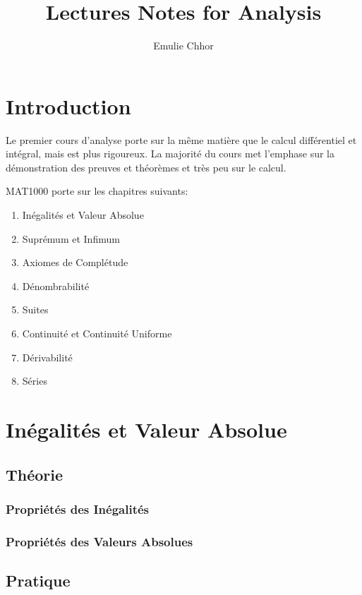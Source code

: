 \documentclass{article}
\begin{document}
\title{Lectures Notes for Analysis}
\author{Emulie Chhor}
\maketitle

\section{Introduction}

Le premier cours d'analyse porte sur la même matière que le calcul différentiel
et intégral, mais est plus rigoureux. La majorité du cours met l'emphase sur la
démonstration des preuves et théorèmes et très peu sur le calcul.

MAT1000 porte sur les chapitres suivants:

    \begin{enumerate}
	\item Inégalités et Valeur Absolue
	\item Suprémum et Infimum
	\item Axiomes de Complétude
	\item Dénombrabilité
	\item Suites
	\item Continuité et Continuité Uniforme
	\item Dérivabilité
	\item Séries
    \end{enumerate}

\section{Inégalités et Valeur Absolue}

\subsection{Théorie}

\subsubsection{Propriétés des Inégalités}

\subsubsection{Propriétés des Valeurs Absolues}

\subsection{Pratique}
\end{document}
